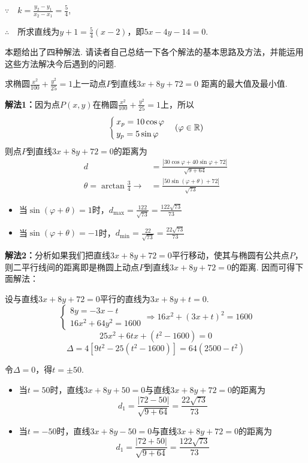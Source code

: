 \begin{solution}
$\because\quad k=\frac{y_2-y_1}{x_2-x_1}=\frac{5}{4}$,

$\therefore\quad$所求直线为$y+1=\frac{5}{4}(x-2)$，即$5x-4y-14=0$.
\end{solution}

\begin{remark}
本题给出了四种解法. 请读者自己总结一下各个解法的基本思路及方法，并能运用这些方法解决今后遇到的问题.
\end{remark}

\begin{example}
    求椭圆$\frac{x^2}{100}+\frac{y^2}{25}=1$上一动点$P$到直线$3x+8y+72=0$
距离的最大值及最小值.
\end{example}

\begin{solution}
\textbf{解法1：}因为点$P(x,y)$在椭圆$\frac{x^2}{100}+\frac{y^2}{25}=1$上，所以
\[\begin{cases}
    x_p=10\cos\varphi\\
    y_p=5\sin\varphi\\
\end{cases}(\varphi\in\mathbb{R})\]
则点$P$到直线$3x+8y+72=0$的距离为
\[\begin{split}
    d&=\frac{|30\cos\varphi+40\sin\varphi+72|}{\sqrt{9+64}}\\
    \theta=\arctan\frac{3}{4}\to &=\frac{|50\sin(\varphi+\theta)+72|}{\sqrt{73}}
\end{split}\]
\begin{itemize}
    \item 当$\sin(\varphi+\theta)=1$时，$d_{\max}=\frac{122}{\sqrt{73}}=\frac{122\sqrt{73}}{73}$
\item 当$\sin(\varphi+\theta)=-1$时，$d_{\min}=\frac{22}{\sqrt{73}}=\frac{22\sqrt{73}}{73}$
\end{itemize}

\textbf{解法2：}分析如果我们把直线$3x+8y+72=0$平行移动，使其与椭圆有公共点$P$，则二平行线间的距离即是椭圆上动点$P$到直线$3x+8y+72=0$的距离. 因而可得下面解法：

设与直线$3x+8y+72=0$平行的直线为$3x+8y+t=0$.
\[\begin{cases}
    8y=-3x-t\\
    16x^2+64y^2=1600
\end{cases}\Rightarrow 16x^2+(3x+t)^2=1600\]
\[25x^2+6tx+(t^2-1600)=0\]
\[\Delta=4[9t^2-25(t^2-1600)]=64(2500-t^2)\]

令$\Delta=0$，得$t=\pm 50$.
\begin{itemize}
    \item 当$t=50$时，直线$3x+8y+50=0$与直线$3x+8y+72=0$的距离为
    \[d_1=\frac{|72-50|}{\sqrt{9+64}}=\frac{22\sqrt{73}}{73}\]
    \item 当$t=-50$时，直线$3x+8y-50=0$与直线$3x+8y+72=0$的距离为
    \[d_1=\frac{|72+50|}{\sqrt{9+64}}=\frac{122\sqrt{73}}{73}\]
\end{itemize}
\end{solution}

